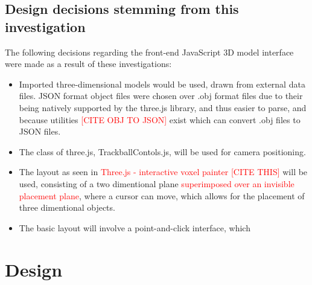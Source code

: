 \subsection{Design decisions stemming from this investigation}
\label{subSec: Three.js: Design decisions stemming from this investigation}

The following decisions regarding the front-end JavaScript 3D model interface were made as a result of these investigations:

\begin{itemize}
\item Imported three-dimensional models would be used, drawn from external data files. JSON format object files were chosen over .obj format files due to their being natively supported by the three.js library, and thus easier to parse, and because utilities \textcolor{red}{[CITE OBJ TO JSON]} exist which can convert .obj files to JSON files.

\item The class of three.js, TrackballContols.js, will be used for camera positioning.

\item The layout as seen in \textcolor{red}{Three.js - interactive voxel painter [CITE THIS]} will be used, consisting of a two dimentional plane \textcolor{red}{superimposed over an invisible placement plane}, where a cursor can move, which allows for the placement of three dimentional objects.

\item The basic layout will involve a point-and-click interface, which  
\end{itemize}

\section{Design}
\label{sec:Design}































